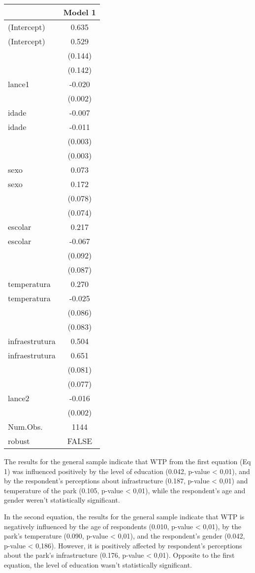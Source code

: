 \documentclass[
]{article}
\begin{document}
\begin{longtable}[]{@{}lc@{}}
\toprule
& Model 1 \\
\midrule
\endhead
(Intercept) & 0.635 \\
(Intercept) & 0.529 \\
& (0.144) \\
& (0.142) \\
lance1 & -0.020 \\
& (0.002) \\
idade & -0.007 \\
idade & -0.011 \\
& (0.003) \\
& (0.003) \\
sexo & 0.073 \\
sexo & 0.172 \\
& (0.078) \\
& (0.074) \\
escolar & 0.217 \\
escolar & -0.067 \\
& (0.092) \\
& (0.087) \\
temperatura & 0.270 \\
temperatura & -0.025 \\
& (0.086) \\
& (0.083) \\
infraestrutura & 0.504 \\
infraestrutura & 0.651 \\
& (0.081) \\
& (0.077) \\
lance2 & -0.016 \\
& (0.002) \\
Num.Obs. & 1144 \\
robust & FALSE \\
\bottomrule
\end{longtable}

The results for the general sample indicate that WTP from the first
equation (Eq 1) was influenced positively by the level of education
(0.042, p-value \textless{} 0,01), and by the respondent's perceptions
about infrastructure (0.187, p-value \textless{} 0,01) and temperature
of the park (0.105, p-value \textless{} 0,01), while the respondent's
age and gender weren't statistically significant.

In the second equation, the results for the general sample indicate that
WTP is negatively influenced by the age of respondents (0.010, p-value
\textless{} 0,01), by the park's temperature (0.090, p-value \textless{}
0,01), and the respondent's gender (0.042, p-value \textless{} 0,186).
However, it is positively affected by respondent's perceptions about the
park's infrastructure (0.176, p-value \textless{} 0,01). Opposite to the
first equation, the level of education wasn't statistically significant.
\end{document}
